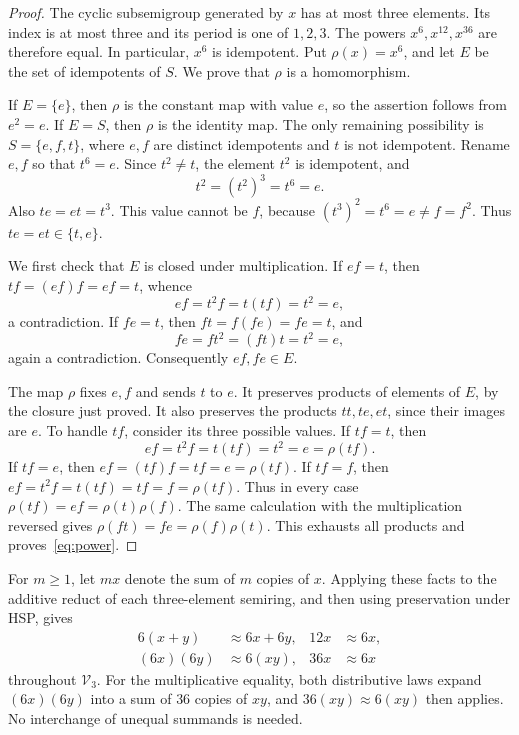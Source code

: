 \documentclass[11pt,reqno]{amsart}
\numberwithin{equation}{section}
\theoremstyle{definition}
\theoremstyle{remark}
\newcommand{\Vthree}{\mathcal V_3}
\newcommand{\eqid}{\approx}
\begin{document}
\begin{proof}
The cyclic subsemigroup generated by $x$ has at most three elements.
Its index is at most three and its period is one of $1,2,3$.
The powers $x^6,x^{12},x^{36}$ are therefore equal. In particular,
$x^6$ is idempotent. Put $\rho(x)=x^6$, and let $E$ be the set
of idempotents of $S$. We prove that $\rho$ is a homomorphism.

If $E=\{e\}$, then $\rho$ is the constant map with value $e$,
so the assertion follows from $e^2=e$. If $E=S$, then $\rho$
is the identity map. The only remaining possibility is
$S=\{e,f,t\}$, where $e,f$ are distinct idempotents and $t$
is not idempotent. Rename $e,f$ so that $t^6=e$.
Since $t^2\ne t$, the element $t^2$ is idempotent, and
\[
t^2=(t^2)^3=t^6=e.
\]
Also $te=et=t^3$. This value cannot be $f$, because
$(t^3)^2=t^6=e\ne f=f^2$. Thus $te=et\in\{t,e\}$.

We first check that $E$ is closed under multiplication.
If $ef=t$, then $tf=(ef)f=ef=t$, whence
\[
ef=t^2f=t(tf)=t^2=e,
\]
a contradiction. If $fe=t$, then $ft=f(fe)=fe=t$, and
\[
fe=ft^2=(ft)t=t^2=e,
\]
again a contradiction. Consequently $ef,fe\in E$.

The map $\rho$ fixes $e,f$ and sends $t$ to $e$.
It preserves products of elements of $E$, by the closure just
proved. It also preserves the products $tt,te,et$, since their
images are $e$. To handle $tf$, consider its three possible
values. If $tf=t$, then
\[
ef=t^2f=t(tf)=t^2=e=\rho(tf).
\]
If $tf=e$, then $ef=(tf)f=tf=e=\rho(tf)$.
If $tf=f$, then $ef=t^2f=t(tf)=tf=f=\rho(tf)$.
Thus in every case
$\rho(tf)=ef=\rho(t)\rho(f)$. The same calculation with
the multiplication reversed gives
$\rho(ft)=fe=\rho(f)\rho(t)$. This exhausts all products
and proves~\eqref{eq:power}.
\end{proof}

For $m\geq1$, let $mx$ denote the sum of $m$ copies of $x$.
Applying these facts to the additive reduct of each
three-element semiring, and then using preservation
under HSP, gives
\begin{equation}\label{eq:reflection}
\begin{aligned}
6(x+y)&\eqid6x+6y, &
12x&\eqid6x,\\
(6x)(6y)&\eqid6(xy),&
36x&\eqid6x
\end{aligned}
\end{equation}
throughout $\Vthree$. For the multiplicative equality,
both distributive laws expand $(6x)(6y)$ into a sum of
$36$ copies of $xy$, and $36(xy)\eqid6(xy)$ then applies.
No interchange of unequal summands is needed.
\end{document}
